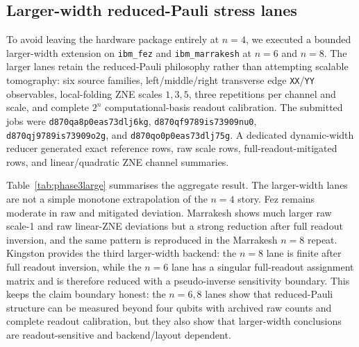 \documentclass[preprint,aps,physrev,superscriptaddress,floatfix,longbibliography]{revtex4-2}
\begin{document}
\subsection{Larger-width reduced-Pauli stress lanes}

To avoid leaving the hardware package entirely at $n=4$, we executed a bounded
larger-width extension on \texttt{ibm\_fez} and \texttt{ibm\_marrakesh} at
$n=6$ and $n=8$. The larger lanes retain the reduced-Pauli philosophy rather
than attempting scalable tomography: six source families, left/middle/right
transverse edge \texttt{XX}/\texttt{YY} observables, local-folding ZNE scales
$1,3,5$, three repetitions per channel and scale, and complete $2^n$
computational-basis readout calibration. The submitted jobs were
\texttt{d870qa8p0eas73dlj6kg}, \texttt{d870qf9789is73909nu0},
\texttt{d870qj9789is73909o2g}, and \texttt{d870qo0p0eas73dlj75g}. A
dedicated dynamic-width reducer generated exact reference rows, raw scale rows,
full-readout-mitigated rows, and linear/quadratic ZNE channel summaries.

Table~\ref{tab:phase3large} summarises the aggregate result. The larger-width
lanes are not a simple monotone extrapolation of the $n=4$ story. Fez remains
moderate in raw and mitigated deviation. Marrakesh shows much larger raw
scale-1 and raw linear-ZNE deviations but a strong reduction after full
readout inversion, and the same pattern is reproduced in the Marrakesh $n=8$
repeat. Kingston provides the third larger-width backend: the $n=8$ lane is
finite after full readout inversion, while the $n=6$ lane has a singular
full-readout assignment matrix and is therefore reduced with a pseudo-inverse
sensitivity boundary. This keeps the claim boundary honest: the $n=6,8$ lanes
show that reduced-Pauli structure can be measured beyond four qubits with
archived raw counts and complete readout calibration, but they also show that
larger-width conclusions are readout-sensitive and backend/layout dependent.
\end{document}
